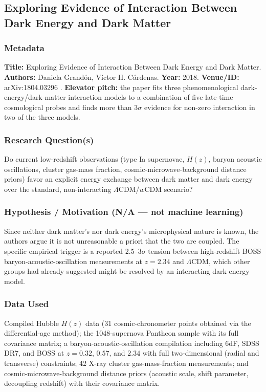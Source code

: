 \documentclass[11pt]{article}
\begin{document}
\subsection{Exploring Evidence of Interaction Between Dark Energy and Dark Matter}
\label{sec:paper7}

\subsubsection{Metadata}
\textbf{Title:} Exploring Evidence of Interaction Between Dark Energy and Dark Matter. \textbf{Authors:} Daniela Grandón, Víctor H. Cárdenas. \textbf{Year:} 2018. \textbf{Venue/ID:} arXiv:1804.03296 \citep{grandon2018evidence}. \textbf{Elevator pitch:} the paper fits three phenomenological dark-energy/dark-matter interaction models to a combination of five late-time cosmological probes and finds more than 3$\sigma$ evidence for non-zero interaction in two of the three models.

\subsubsection{Research Question(s)}
Do current low-redshift observations (type Ia supernovae, $H(z)$, baryon acoustic oscillations, cluster gas-mass fraction, cosmic-microwave-background distance priors) favor an explicit energy exchange between dark matter and dark energy over the standard, non-interacting $\Lambda$CDM/$w$CDM scenario?

\subsubsection{Hypothesis / Motivation (N/A --- not machine learning)}
Since neither dark matter's nor dark energy's microphysical nature is known, the authors argue it is not unreasonable a priori that the two are coupled. The specific empirical trigger is a reported 2.5--3$\sigma$ tension between high-redshift BOSS baryon-acoustic-oscillation measurements at $z=2.34$ and $\Lambda$CDM, which other groups had already suggested might be resolved by an interacting dark-energy model.

\subsubsection{Data Used}
Compiled Hubble $H(z)$ data (31 cosmic-chronometer points obtained via the differential-age method); the 1048-supernova Pantheon sample with its full covariance matrix; a baryon-acoustic-oscillation compilation including 6dF, SDSS DR7, and BOSS at $z=0.32$, $0.57$, and $2.34$ with full two-dimensional (radial and transverse) constraints; 42 X-ray cluster gas-mass-fraction measurements; and cosmic-microwave-background distance priors (acoustic scale, shift parameter, decoupling redshift) with their covariance matrix.
\end{document}
